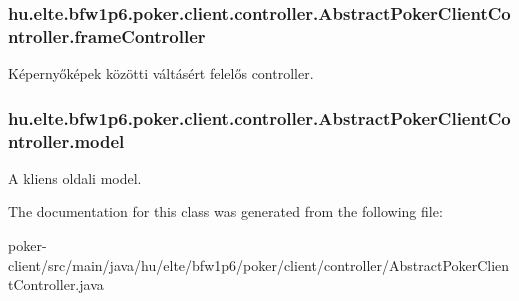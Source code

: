 \subsubsection[{frame\+Controller}]{ hu.\+elte.\+bfw1p6.\+poker.\+client.\+controller.\+Abstract\+Poker\+Client\+Controller.\+frame\+Controller\hspace{0.3cm}{\ttfamily [protected]}}\label{classhu_1_1elte_1_1bfw1p6_1_1poker_1_1client_1_1controller_1_1_abstract_poker_client_controller_a747c3be2b66fbc23a69bfe6ebe3e4022}
Képernyőképek közötti váltásért felelős controller. \hypertarget{classhu_1_1elte_1_1bfw1p6_1_1poker_1_1client_1_1controller_1_1_abstract_poker_client_controller_a3e132d05c2e362b74ff9c220ce6c4f13}{}
\subsubsection[{model}]{ hu.\+elte.\+bfw1p6.\+poker.\+client.\+controller.\+Abstract\+Poker\+Client\+Controller.\+model\hspace{0.3cm}{\ttfamily [protected]}}\label{classhu_1_1elte_1_1bfw1p6_1_1poker_1_1client_1_1controller_1_1_abstract_poker_client_controller_a3e132d05c2e362b74ff9c220ce6c4f13}
A kliens oldali model. 

The documentation for this class was generated from the following file\+:\begin{DoxyCompactItemize}
\item 
poker-\/client/src/main/java/hu/elte/bfw1p6/poker/client/controller/Abstract\+Poker\+Client\+Controller.\+java\end{DoxyCompactItemize}
